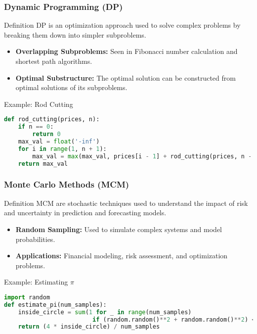 \documentclass[aspectratio=169]{beamer}
\begin{document}
\begin{frame}[fragile]
    \frametitle{Dynamic Programming (DP)}
    \begin{block}{Definition}
        DP is an optimization approach used to solve complex problems by breaking them down into simpler subproblems.
    \end{block}
    \begin{itemize}
        \item \textbf{Overlapping Subproblems:} Seen in Fibonacci number calculation and shortest path algorithms.
        \item \textbf{Optimal Substructure:} The optimal solution can be constructed from optimal solutions of its subproblems.
    \end{itemize}
    \begin{block}{Example: Rod Cutting}
        \begin{lstlisting}[language=Python]
def rod_cutting(prices, n):
    if n == 0:
        return 0
    max_val = float('-inf')
    for i in range(1, n + 1):
        max_val = max(max_val, prices[i - 1] + rod_cutting(prices, n - i))
    return max_val
        \end{lstlisting}
    \end{block}
\end{frame}

\begin{frame}[fragile]
    \frametitle{Monte Carlo Methods (MCM)}
    \begin{block}{Definition}
        MCM are stochastic techniques used to understand the impact of risk and uncertainty in prediction and forecasting models.
    \end{block}
    \begin{itemize}
        \item \textbf{Random Sampling:} Used to simulate complex systems and model probabilities.
        \item \textbf{Applications:} Financial modeling, risk assessment, and optimization problems.
    \end{itemize}
    \begin{block}{Example: Estimating $\pi$}
        \begin{lstlisting}[language=Python]
import random
def estimate_pi(num_samples):
    inside_circle = sum(1 for _ in range(num_samples)
                         if (random.random()**2 + random.random()**2) <= 1)
    return (4 * inside_circle) / num_samples
        \end{lstlisting}
    \end{block}
\end{frame}
\end{document}
